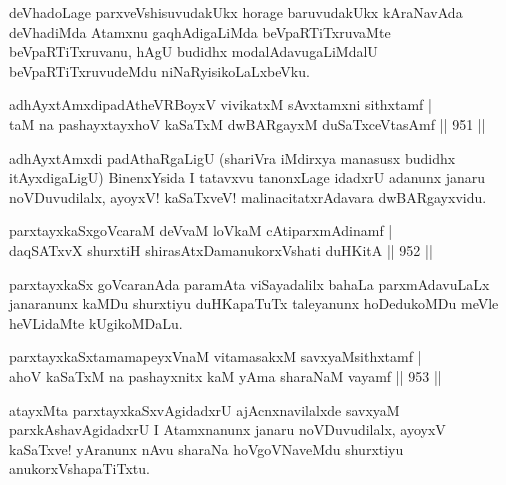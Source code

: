 \begin{artha}
deVhadoLage parxveVshisuvudakUkx horage baruvudakUkx  kAraNavAda deVhadiMda Atamxnu gaqhAdigaLiMda beVpaRTiTxruvaMte beVpaRTiTxruvanu, hAgU budidhx modalAdavugaLiMdalU beVpaRTiTxruvudeMdu niNaRyisikoLaLxbeVku.
\end{artha}


\begin{shl}
adhAyxtAmxdipadAtheVRBoyxV vivikatxM sAvxtamxni sithxtamf | \\
taM na pashayxtayxhoV kaSaTxM dwBARgayxM duSaTxceVtasAmf \hfill||  951 ||  
\end{shl}

\begin{artha}
adhAyxtAmxdi padAthaRgaLigU (shariVra iMdirxya manasusx budidhx itAyxdigaLigU) BinenxYsida I tatavxvu tanonxLage idadxrU adanunx janaru noVDuvudilalx, ayoyxV! kaSaTxveV! malinacitatxrAdavara dwBARgayxvidu.
\end{artha}

\begin{shl}
parxtayxkaSxgoVcaraM deVvaM loVkaM cAtiparxmAdinamf | \\
daqSATxvX shurxtiH shirasAtxDamanukorxVshati duHKitA \hfill||  952 ||  
\end{shl}

\begin{artha}
parxtayxkaSx goVcaranAda paramAta viSayadalilx bahaLa parxmAdavuLaLx janaranunx kaMDu shurxtiyu duHKapaTuTx taleyanunx hoDedukoMDu meVle heVLidaMte kUgikoMDaLu.
\end{artha}


\begin{shl}
parxtayxkaSxtamamapeyxVnaM vitamasakxM savxyaMsithxtamf | \\
ahoV kaSaTxM na pashayxnitx kaM yAma sharaNaM vayamf \hfill||  953 ||  
\end{shl}

\begin{artha}
atayxMta parxtayxkaSxvAgidadxrU ajAcnxnavilalxde savxyaM parxkAshavAgidadxrU I Atamxnanunx janaru noVDuvudilalx, ayoyxV kaSaTxve! yAranunx nAvu sharaNa hoVgoVNaveMdu shurxtiyu anukorxVshapaTiTxtu.
\end{artha}


